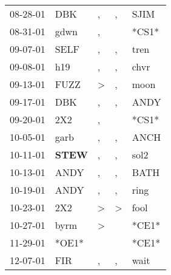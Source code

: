 \begin{supertabular}{p{0.07\textwidth}p{0.06\textwidth}p{0.02\textwidth}p{0.02\textwidth}p{0.06\textwidth}}
 08-28-01\textsuperscript{} &            DBK\textsuperscript{} &                , &                , &           SJIM\textsuperscript{} \\
 08-31-01\textsuperscript{} &           gdwn\textsuperscript{} &                , &                  &                            *CS1* \\
 09-07-01\textsuperscript{} &           SELF\textsuperscript{} &                , &                , &           tren\textsuperscript{} \\
 09-08-01\textsuperscript{} &            h19\textsuperscript{} &                , &                , &           chvr\textsuperscript{} \\
 09-13-01\textsuperscript{} &           FUZZ\textsuperscript{} &     \textgreater &                , &           moon\textsuperscript{} \\
 09-17-01\textsuperscript{} &            DBK\textsuperscript{} &                , &                , &           ANDY\textsuperscript{} \\
 09-20-01\textsuperscript{} &            2X2\textsuperscript{} &                , &                  &                            *CS1* \\
 10-05-01\textsuperscript{} &           garb\textsuperscript{} &                , &                , &           ANCH\textsuperscript{} \\
 10-11-01\textsuperscript{} &  \textbf{STEW\textsuperscript{}} &                , &                , &           sol2\textsuperscript{} \\
 10-13-01\textsuperscript{} &           ANDY\textsuperscript{} &                , &                , &           BATH\textsuperscript{} \\
 10-19-01\textsuperscript{} &           ANDY\textsuperscript{} &                , &                , &           ring\textsuperscript{} \\
 10-23-01\textsuperscript{} &            2X2\textsuperscript{} &     \textgreater &     \textgreater &           fool\textsuperscript{} \\
 10-27-01\textsuperscript{} &           byrm\textsuperscript{} &     \textgreater &                  &                            *CE1* \\
 11-29-01\textsuperscript{} &                            *OE1* &                  &                  &                            *CE1* \\
 12-07-01\textsuperscript{} &            FIR\textsuperscript{} &                , &                , &           wait\textsuperscript{} \\

\end{supertabular}
